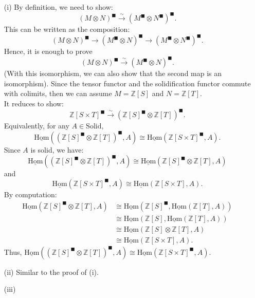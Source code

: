 \documentclass[UTF8,12,a4paper]{ctexart}
\theoremstyle{definition}
\begin{document}
\pf
\begin{itemize}
	\item [(i)] By definition, we need to show:
	$$
	(M\otimes N)^\blacksquare\stackrel{\sim}{\longrightarrow} (M^\blacksquare\otimes N^\blacksquare)^\blacksquare.
	$$
	This can be written as the composition:
	$$
	(M\otimes N)^\blacksquare \longrightarrow (M^\blacksquare\otimes N)^\blacksquare\longrightarrow (M^\blacksquare\otimes N^\blacksquare)^\blacksquare.
	$$
	Hence, it is enough to prove 
	$$
		(M\otimes N)^\blacksquare \stackrel{\sim}{\longrightarrow} (M^\blacksquare\otimes N)^\blacksquare.
	$$
	(With this isomorphism, we can also show that the second map is an isomorphism). Since the tensor functor and the solidification functor commute with colimits, then we can assume $M=\mathbb{Z}[S]$ and $N=\mathbb{Z}[T].$\\
	It reduces to show:
	$$
	\mathbb{Z}[S\times T]^\blacksquare\stackrel{\sim}{\longrightarrow}
	(\mathbb{Z}[S]^\blacksquare\otimes \mathbb{Z}[T])^\blacksquare.
	$$
	Equivalently, for any $A\in\text{Solid}$,
	$$
	\underline{\text{Hom}}((\mathbb{Z}[S]^\blacksquare\otimes \mathbb{Z}[T])^\blacksquare, A)\cong 	\underline{\text{Hom}}(\mathbb{Z}[S\times T]^\blacksquare, A).
	$$
	Since $A$ is solid, we have:
	$$
	\underline{\text{Hom}}((\mathbb{Z}[S]^\blacksquare\otimes \mathbb{Z}[T])^\blacksquare, A)\cong \underline{\text{Hom}}(\mathbb{Z}[S]^\blacksquare\otimes \mathbb{Z}[T], A)
	$$
	and 
	$$
	\underline{\text{Hom}}(\mathbb{Z}[S\times T]^\blacksquare, A)\cong\underline{\text{Hom}}(\mathbb{Z}[S\times T], A).
	$$
	By computation:
	\begin{align*}
	\underline{\text{Hom}}(\mathbb{Z}[S]^\blacksquare\otimes \mathbb{Z}[T], A)
	&\cong 	\underline{\text{Hom}}(\mathbb{Z}[S]^\blacksquare,\underline{\text{Hom}}(\mathbb{Z}[T], A))\\
	&\cong 	\underline{\text{Hom}}(\mathbb{Z}[S],\underline{\text{Hom}}(\mathbb{Z}[T], A))\\
	&\cong \underline{\text{Hom}}(\mathbb{Z}[S]\otimes\mathbb{Z}[T],A)\\
	&\cong \underline{\text{Hom}}(\mathbb{Z}[S\times T], A).
	\end{align*}
	Thus, $	\underline{\text{Hom}}((\mathbb{Z}[S]^\blacksquare\otimes \mathbb{Z}[T])^\blacksquare, A)\cong 	\underline{\text{Hom}}(\mathbb{Z}[S\times T]^\blacksquare, A).$
	\item [(ii)] Similar to the proof of (i).
	\item [(iii)]
\end{itemize}
\end{document}

